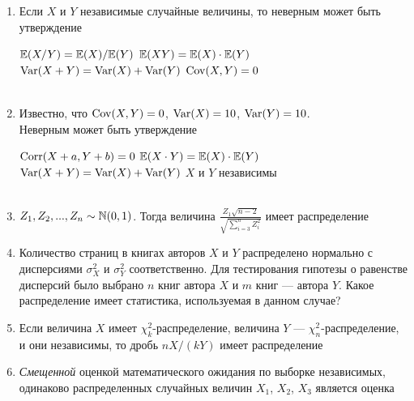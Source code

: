 \documentclass[12pt, a4paper]{article}\usepackage[]{graphicx}\usepackage[]{color}
\begin{document}
\begin{enumerate}
					\item Если $X$ и $Y$ независимые случайные величины, то неверным может быть утверждение

					{$\mathbb{E}(X/Y)=\mathbb{E}(X)/\mathbb{E}(Y)$}
					{$\mathbb{E}(XY)=\mathbb{E}(X)\cdot\mathbb{E}(Y)$}
					{$\operatorname{Var}(X+Y)=\operatorname{Var}(X)+\operatorname{Var}(Y)$}
					{$\operatorname{Cov}(X,Y)=0$} \\ \\

					\item Известно, что  $\operatorname{Cov}(X,Y)=0$, $\operatorname{Var}(X)=10$, $\operatorname{Var}(Y)=10$. \\
					Неверным может быть утверждение

					{$\operatorname{Corr}(X+a,Y+b)=0$}
					{$\mathbb{E}(X\cdot Y)=\mathbb{E}(X)\cdot \mathbb{E}(Y)$}
					{$\operatorname{Var}(X+Y)=\operatorname{Var}(X)+\operatorname{Var}(Y)$}
					{$X$ и $Y$ независимы} \\ \\

					\item $Z_1,Z_2,...,Z_n\sim\mathbb N(0,1)$. Тогда величина $\frac{Z_1\sqrt{n-2}}{\sqrt{\sum_{i=3}^n Z_i^2}}$ имеет распределение


					\item Количество страниц в книгах авторов $X$ и $Y$ распределено нормально с дисперсиями $\sigma^2_X$ и $\sigma^2_Y$ соответственно. Для тестирования гипотезы о равенстве дисперсий было выбрано $n$ книг автора $X$ и $m$ книг — автора $Y$. Какое распределение имеет статистика, используемая в данном случае?


					\item Если величина $X$ имеет $\chi^2_k$-распределение, величина $Y$ — $\chi^2_n$-распределение, и они независимы, то дробь $nX/(kY)$ имеет распределение


					\item \emph{Смещенной} оценкой математического ожидания по выборке независимых, одинаково распределенных случайных величин $X_1$, $X_2$, $X_3$ является оценка

					 \\ \\


\end{enumerate}
\end{document}
